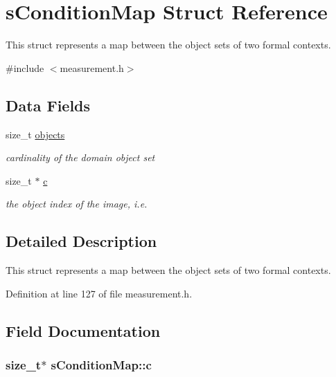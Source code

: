 \hypertarget{structsConditionMap}{\section{s\-Condition\-Map \-Struct \-Reference}
\label{structsConditionMap}
}


\-This struct represents a map between the object sets of two formal contexts.  




{\ttfamily \#include $<$measurement.\-h$>$}

\subsection*{\-Data \-Fields}
\begin{DoxyCompactItemize}
\item 
size\-\_\-t \hyperlink{structsConditionMap_aba0e3734a3c3c6de4f39d9a6c72f3cca}{objects}
\begin{DoxyCompactList}\small\item\em cardinality of the domain object set \end{DoxyCompactList}\item 
size\-\_\-t $\ast$ \hyperlink{structsConditionMap_a8fba8e129aa41cc4fd2f1898e83c2f28}{c}
\begin{DoxyCompactList}\small\item\em the object index of the image, i.\-e. \end{DoxyCompactList}\end{DoxyCompactItemize}


\subsection{\-Detailed \-Description}
\-This struct represents a map between the object sets of two formal contexts. 

\-Definition at line 127 of file measurement.\-h.



\subsection{\-Field \-Documentation}
\hypertarget{structsConditionMap_a8fba8e129aa41cc4fd2f1898e83c2f28}{
\subsubsection[{c}]{\setlength{\rightskip}{0pt plus 5cm}size\-\_\-t$\ast$ {\bf s\-Condition\-Map\-::c}}}\label{structsConditionMap_a8fba8e129aa41cc4fd2f1898e83c2f28}


